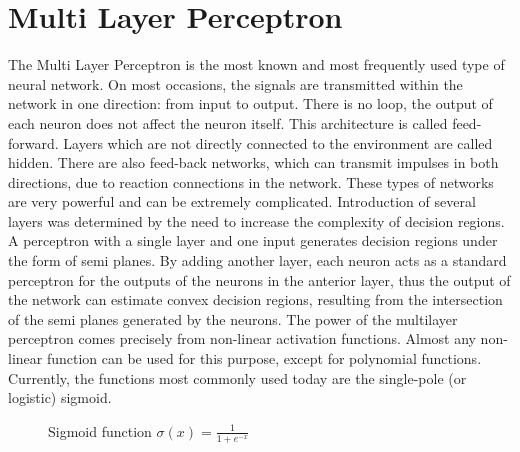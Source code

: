 \section{Multi Layer Perceptron}
The Multi Layer Perceptron is the most known and
most frequently used type of neural network\cite{mlp}. On
most occasions, the signals are transmitted within the
network in one direction: from input to output. There
is no loop, the output of each neuron does not affect
the neuron itself. This architecture is called feed-
forward\cite{mlp}.
Layers which are not directly connected to the
environment are called hidden. There are also
feed-back networks, which can transmit impulses in
both directions, due to reaction connections in the
network. These types of networks are very powerful\cite{mlp}
and can be extremely complicated\cite{mlp}.
Introduction of several layers was
determined by the need to increase the complexity of
decision regions. A perceptron with a single layer and one
input generates decision regions under the form of
semi planes\cite{mlp}. By adding another layer, each neuron
acts as a standard perceptron for the outputs of the
neurons in the anterior layer, thus the output of the
network can estimate convex decision regions,
resulting from the intersection of the semi planes
generated by the neurons.
The power of the multilayer perceptron comes
precisely from non-linear activation functions\cite{mlp}.
Almost any non-linear function can be used for this
purpose, except for polynomial functions. Currently,
the functions most commonly used\cite{mlp} today are the
single-pole (or logistic) sigmoid.

\begin{figure}[H]
	\centering
	\caption{Sigmoid function $\sigma(x) = \frac{1}{1+e^{-x}}$}
	\label{fig:sigmoid}
\end{figure}

